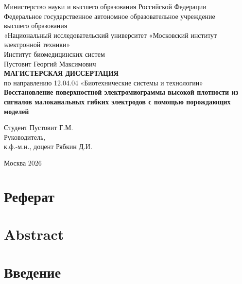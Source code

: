 \documentclass[14pt,a4paper]{extarticle}
\begin{document}
\begin{titlepage}
\thispagestyle{empty}
\begin{center}
Министерство науки и высшего образования Российской Федерации\\
Федеральное государственное автономное образовательное учреждение\\
высшего образования\\
«Национальный исследовательский университет «Московский институт электронной техники»\\[1em]
Институт биомедицинских систем\\[3em]

Пустовит Георгий Максимович\\[3em]

{\Large\bfseries МАГИСТЕРСКАЯ ДИССЕРТАЦИЯ}\\[1em]
по направлению 12.04.04 «Биотехнические системы и технологии»\\[2em]

{\Large\bfseries Восстановление поверхностной электромиограммы высокой плотности из сигналов малоканальных гибких электродов с помощью порождающих моделей}
\end{center}

\vfill

\begin{flushright}
Студент Пустовит Г.М.\\[1em]
Руководитель,\\
к.ф.-м.н., доцент Рябкин Д.И.\\
\end{flushright}

\vfill

\begin{center}Москва 2026\end{center}
\end{titlepage}

\tableofcontents
\clearpage

\section*{Реферат}

\section*{Abstract}

\section*{Введение}
\end{document}
